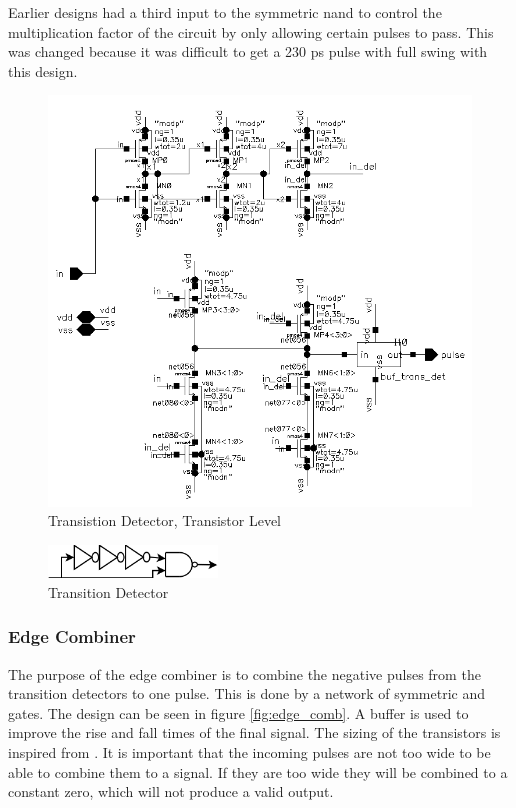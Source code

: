 \documentclass[a4paper,12pt]{article} \usepackage{graphicx}
\begin{document}
Earlier designs had a third input to the symmetric nand to control the
multiplication factor of the circuit by only allowing certain pulses to pass.
This was changed because it was difficult to get a 230 ps pulse with full swing
with this design.

\begin{figure}[p]
        \centering
        \includegraphics[width=\textwidth]{../Bilder/trans_detect_trans.png}
        \caption{Transistion Detector, Transistor Level}
        \label{fig:trans_detect_trans}
\end{figure}

\begin{figure}[p]
        \centering
        \includegraphics[width=0.4\textwidth]{../Bilder/trans_detect.png}
        \caption{Transition Detector}
        \label{fig:trans_detect}
\end{figure}

\subsubsection{Edge Combiner}
The purpose of the edge combiner is to combine the negative pulses from the
transition detectors to one pulse. This is done by a network of symmetric and
gates. The design can be seen in figure \ref{fig:edge_comb}. A buffer is used to
improve the rise and fall times of the final signal.
The sizing of the transistors is inspired from \cite{dll_report}.
It is important that the incoming pulses are not too wide to be able to combine
them to a signal. If they are too wide they will be combined to a constant zero,
which will not produce a valid output.
\end{document}
